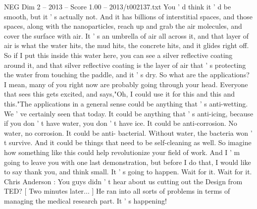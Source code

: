 \begin{textsample}{NEG Dim 2 – 2013 – Score 1.00 – 2013/t002137.txt}
You ' d think it ' d be smooth, but it ' s actually not.
And it has billions of interstitial spaces, and those spaces, along with the nanoparticles, reach up and grab the air molecules, and cover the surface with air.
It ' s an umbrella of air all across it, and that layer of air is what the water hits, the mud hits, the concrete hits, and it glides right off.
So if I put this inside this water here, you can see a silver reflective coating around it, and that silver reflective coating is the layer of air that ' s protecting the water from touching the paddle, and it ' s dry.
So what are the applications?
I mean, many of you right now are probably going through your head.
Everyone that sees this gets excited, and says,"Oh, I could use it for this and this and this."The applications in a general sense could be anything that ' s anti-wetting.
We ' ve certainly seen that today.
It could be anything that ' s anti-icing, because if you don ' t have water, you don ' t have ice.
It could be anti-corrosion.
No water, no corrosion.
It could be anti- bacterial.
Without water, the bacteria won ' t survive.
And it could be things that need to be self-cleaning as well.
So imagine how something like this could help revolutionize your field of work.
And I ' m going to leave you with one last demonstration, but before I do that, I would like to say thank you, and think small.
It ' s going to happen.
Wait for it.
Wait for it.
Chris Anderson : You guys didn ' t hear about us cutting out the Design from TED? [ Two minutes later... ] He ran into all sorts of problems in terms of managing the medical research part.
It ' s happening!

\end{textsample}
